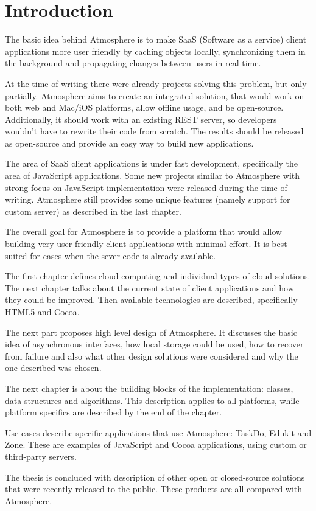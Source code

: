 \setcounter{page}{1}
\setcounter{equation}{0}
\setcounter{figure}{0}
\setcounter{table}{0}

\section*{Introduction}

The basic idea behind Atmosphere is to make SaaS (Software as a service) client applications more user friendly by caching objects locally, synchronizing them in the background and propagating changes between users in real-time.

At the time of writing there were already projects solving this problem, but only partially. Atmosphere aims to create an integrated solution, that would work on both web and Mac/iOS platforms, allow offline usage, and be open-source. Additionally, it should work with an existing REST server, so developers wouldn't have to rewrite their code from scratch. The results should be released as open-source and provide an easy way to build new applications.

The area of SaaS client applications is under fast development, specifically the area of JavaScript applications. Some new projects similar to Atmosphere with strong focus on JavaScript implementation were released during the time of writing. Atmosphere still provides some unique features (namely support for custom server) as described in the last chapter.

The overall goal for Atmosphere is to provide a platform that would allow building very user friendly client applications with minimal effort. It is best-suited for cases when the sever code is already available.

The first chapter defines cloud computing and individual types of cloud solutions. The next chapter talks about the current state of client applications and how they could be improved. Then available technologies are described, specifically HTML5 and Cocoa.

The next part proposes high level design of Atmosphere. It discusses the basic idea of asynchronous interfaces, how local storage could be used, how to recover from failure and also what other design solutions were considered and why the one described was chosen.

The next chapter is about the building blocks of the implementation: classes, data structures and algorithms. This description applies to all platforms, while platform specifics are described by the end of the chapter.

Use cases describe specific applications that use Atmosphere: TaskDo, Edukit and Zone. These are examples of JavaScript and Cocoa applications, using custom or third-party servers.

The thesis is concluded with description of other open or closed-source solutions that were recently released to the public. These products are all compared with Atmosphere.